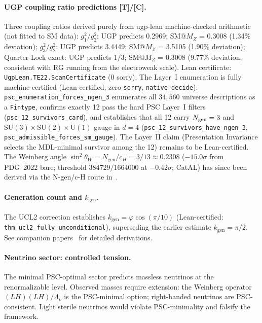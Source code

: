 \documentclass[11pt]{article}
\newcommand{\tagT}{\textbf{[T]}}
\newcommand{\tagC}{\textbf{[C]}}
\theoremstyle{plain}
\theoremstyle{definition}
\theoremstyle{remark}
\begin{document}
\paragraph{UGP coupling ratio predictions \tagT{}/\tagC{}.}
Three coupling ratios derived purely from ugp-lean machine-checked arithmetic
(not fitted to SM data):
$g_1^2/g_2^2$: UGP predicts 0.2969; SM@$M_Z$ = 0.3008 (1.34\% deviation);
$g_3^2/g_2^2$: UGP predicts 3.4449; SM@$M_Z$ = 3.5105 (1.90\% deviation);
Quarter-Lock exact: UGP predicts $1/3$; SM@$M_Z$ = 0.3008 (9.77\% deviation,
consistent with RG running from the electroweak scale).
Lean certificate: \texttt{UgpLean.TE22.ScanCertificate} (0 sorry).
The Layer~I enumeration is fully machine-certified (Lean-certified, zero \texttt{sorry},
\texttt{native\_decide}): \texttt{psc\_enumeration\_forces\_ngen\_3} enumerates
all $34{,}560$ universe descriptions as a \texttt{Fintype}, confirms exactly 12
pass the hard PSC Layer~I filters (\texttt{psc\_12\_survivors\_card}), and
establishes that all 12 carry $N_{\rm gen}=3$ and
$\mathrm{SU}(3){\times}\mathrm{SU}(2){\times}\mathrm{U}(1)$ gauge in $d=4$
(\texttt{psc\_12\_survivors\_have\_ngen\_3}, \texttt{psc\_admissible\_forces\_sm\_gauge}).
The Layer~II claim (Presentation Invariance selects the MDL-minimal survivor among
the 12) remains to be Lean-certified.
The Weinberg angle $\sin^2\theta_W = N_\mathrm{gen}/c_H = 3/13 \approx 0.2308$ ($-15.0\sigma$ from PDG~2022 bare; threshold $384729/1664000$ at $-0.42\sigma$; CatAL) has since been derived via the N-gen/c-H route in~\cite{SpivackWeinberg}.

\paragraph{Generation count and $k_{\mathrm{gen}}$.}
The UCL2 correction establishes $k_{\mathrm{gen}} = \varphi\cos(\pi/10)$
(Lean-certified: \texttt{thm\_ucl2\_fully\_unconditional}),
superseding the earlier estimate $k_{\mathrm{gen}} = \pi/2$.
See companion papers~\cite{Spivack2026_SM_UGP,Spivack2026_Koide,Spivack2026_CyclotomicMass}
for detailed derivations.

\paragraph{Neutrino sector: controlled tension.}
The minimal PSC-optimal sector predicts massless neutrinos at the renormalizable level.
Observed masses require extension: the Weinberg operator $(LH)(LH)/\Lambda_\nu$
is the PSC-minimal option; right-handed neutrinos are PSC-consistent.
Light sterile neutrinos would violate PSC-minimality and falsify the framework.
\end{document}
